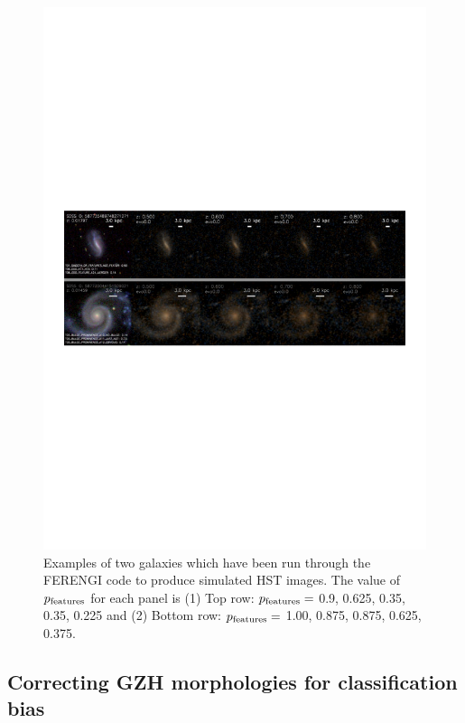 \documentclass[usenatbib]{mn2e}
\begin{document}
\begin{figure}
\includegraphics[width=160mm]{figures/example_ferengi.pdf}
\caption{Examples of two galaxies which have been run through the FERENGI code to produce simulated HST images. The value of $p_{\rm features}$ for each panel is (1) Top row: $p_{\rm features}=$ 0.9, 0.625, 0.35, 0.35, 0.225 and (2) Bottom row: $p_{\rm features}=$ 1.00, 0.875, 0.875, 0.625, 0.375. \label{exampleFERENGI}}
\end{figure}

\subsection{Correcting GZH morphologies for classification bias}
\label{sec:zeta}
\end{document}
